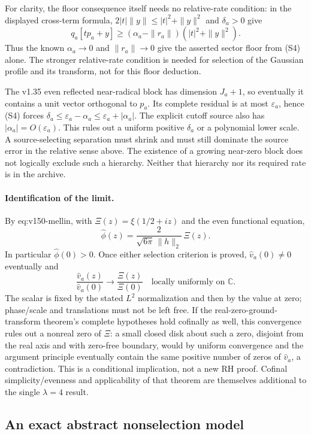 For clarity, the floor consequence itself needs no relative-rate
condition: in the displayed cross-term formula,
$2|t|\|y\|\le |t|^2+\|y\|^2$ and $\delta_a>0$ give
\[
 q_a[tp_a+y]\ge(\alpha_a-\|r_a\|)(|t|^2+\|y\|^2).
\]
Thus the known $\alpha_a\to0$ and $\|r_a\|\to0$ give the asserted
sector floor from (S4) alone. The stronger relative-rate condition
is needed for selection of the Gaussian profile and its transform,
not for this floor deduction.

The v1.35 even reflected near-radical block has dimension $J_a+1$,
so eventually it contains a unit vector orthogonal to $p_a$. Its complete
residual is at most $\varepsilon_a$, hence (S4) forces
$\delta_a\le\varepsilon_a-\alpha_a\le\varepsilon_a+|\alpha_a|$.
The explicit cutoff source also has $|\alpha_a|=O(\varepsilon_a)$.
This rules out a uniform positive $\delta_a$ or a polynomial lower scale.
A source-selecting separation must shrink and must still dominate the
source error in the relative sense above. The existence of a growing
near-zero block does not logically exclude such a hierarchy. Neither
that hierarchy nor its required rate is in the archive.

\paragraph{Identification of the limit.}
By \textup{eq:v150-mellin}, with
$\Xi(z)=\xi(1/2+iz)$ and the even functional equation,
\[
 \widehat\phi(z)=\frac{2}{\sqrt{6\pi}\,\|h\|_2}\,\Xi(z).
\]
In particular $\widehat\phi(0)>0$. Once either selection criterion is
proved, $\widehat v_a(0)\ne0$ eventually and
\[
 \frac{\widehat v_a(z)}{\widehat v_a(0)}
 \longrightarrow\frac{\Xi(z)}{\Xi(0)}
 \quad\text{locally uniformly on }\mathbb C.
\]
The scalar is fixed by the stated $L^2$ normalization and then by the
value at zero; phase/scale and translations must not be left free.
If the real-zero-ground-transform theorem's complete hypotheses hold
cofinally as well, this convergence rules out a nonreal zero of $\Xi$:
a small closed disk about such a zero, disjoint from the real axis and
with zero-free boundary, would by uniform convergence and the argument
principle eventually contain the same positive number of zeros of
$\widehat v_a$, a contradiction. This is a conditional implication,
not a new RH proof. Cofinal simplicity/evenness and applicability of
that theorem are themselves additional to the single $\lambda=4$ result.

\subsection*{An exact abstract nonselection model}

